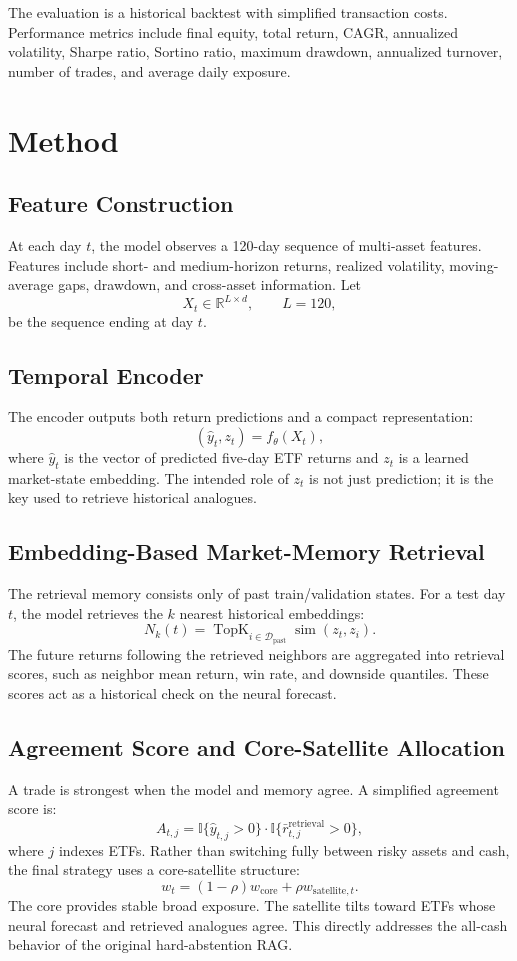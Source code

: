 \documentclass[11pt]{article}
\begin{document}
The evaluation is a historical backtest with simplified transaction costs. Performance metrics include final equity, total return, CAGR, annualized volatility, Sharpe ratio, Sortino ratio, maximum drawdown, annualized turnover, number of trades, and average daily exposure.

\section{Method}
\subsection{Feature Construction}
At each day $t$, the model observes a 120-day sequence of multi-asset features. Features include short- and medium-horizon returns, realized volatility, moving-average gaps, drawdown, and cross-asset information. Let
\[
X_t \in \mathbb{R}^{L \times d}, \qquad L=120,
\]
be the sequence ending at day $t$.

\subsection{Temporal Encoder}
The encoder outputs both return predictions and a compact representation:
\[
(\hat{y}_t, z_t) = f_\theta(X_t),
\]
where $\hat{y}_t$ is the vector of predicted five-day ETF returns and $z_t$ is a learned market-state embedding. The intended role of $z_t$ is not just prediction; it is the key used to retrieve historical analogues.

\subsection{Embedding-Based Market-Memory Retrieval}
The retrieval memory consists only of past train/validation states. For a test day $t$, the model retrieves the $k$ nearest historical embeddings:
\[
N_k(t)=\operatorname{TopK}_{i\in \mathcal{D}_{\mathrm{past}}} \operatorname{sim}(z_t,z_i).
\]
The future returns following the retrieved neighbors are aggregated into retrieval scores, such as neighbor mean return, win rate, and downside quantiles. These scores act as a historical check on the neural forecast.

\subsection{Agreement Score and Core-Satellite Allocation}
A trade is strongest when the model and memory agree. A simplified agreement score is:
\[
A_{t,j}=\mathbb{I}\{\hat{y}_{t,j}>0\}\cdot \mathbb{I}\{\bar{r}^{\mathrm{retrieval}}_{t,j}>0\},
\]
where $j$ indexes ETFs. Rather than switching fully between risky assets and cash, the final strategy uses a core-satellite structure:
\[
 w_t = (1-\rho)w_{\mathrm{core}} + \rho w_{\mathrm{satellite},t}.
\]
The core provides stable broad exposure. The satellite tilts toward ETFs whose neural forecast and retrieved analogues agree. This directly addresses the all-cash behavior of the original hard-abstention RAG.
\end{document}
